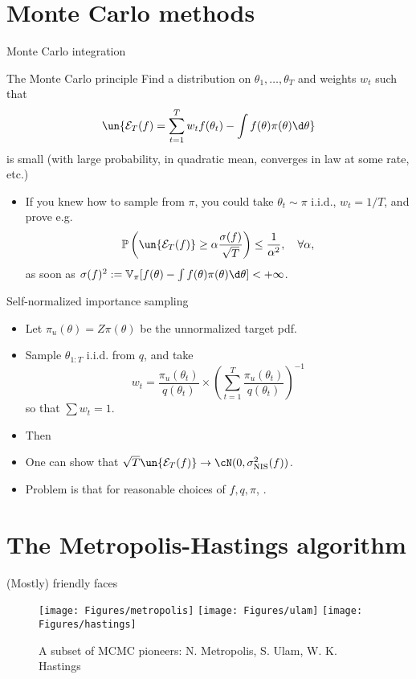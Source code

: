 \documentclass[10pt]{beamer}
\begin{document}
\section{Monte Carlo methods}
\begin{frame}{Monte Carlo integration}
\begin{block}{The Monte Carlo principle}
Find a distribution on $\theta_1,\dots,\theta_T$ and weights $w_t$ such that
$$ \un{\mathcal{E}_T(f) =  \sum_{t=1}^T w_t f(\theta_t) - \int f(\theta)\pi(\theta)\d \theta}$$
is small (with large probability, in quadratic mean, converges in law at some rate, etc.)
\end{block}
\begin{itemize}
  \item If you knew how to sample from $\pi$, you could take $\theta_t\sim\pi$ i.i.d., $w_t=1/T$, and prove e.g.
  $$ \mathbb{P}\left( \un{\mathcal{E}_T(f)} \geq \alpha\frac{\sigma(f)}{\sqrt{T}} \right) \leq \frac{1}{\alpha^2}, \quad \forall \alpha,$$
  as soon as $\sigma(f)^2 := \mathbb{V}_\pi [f(\theta) - \int f(\theta)\pi(\theta)\d\theta]<+\infty$.
\end{itemize}
\end{frame}

\begin{frame}{Self-normalized importance sampling}
\begin{itemize}
  \item Let $\pi_u(\theta) = Z\pi(\theta)$ be the unnormalized target pdf.
  \item Sample $\theta_{1:T}$ i.i.d. from $q$, and take
  $$
  w_t = \frac{\pi_u(\theta_t)}{q(\theta_t)} \times \left( \sum_{t=1}^T \frac{\pi_u(\theta_t)}{q(\theta_t)} \right)^{-1}
  $$
  so that $\sum w_t = 1$.
  \item Then
  $$$$
  \vfill
  \item One can show that $ \sqrt{T}\un{\mathcal{E}_T(f)} \rightarrow \cN(0, \sigma^2_{\text{NIS}}(f))$.
  \item Problem is that for reasonable choices of $f,q,\pi$, .
\end{itemize}
\end{frame}

\section{The Metropolis-Hastings algorithm}

\begin{frame}{(Mostly) friendly faces}
\begin{figure}
  \hfill
  \texttt{[image: Figures/metropolis]}
  \hfill
  \texttt{[image: Figures/ulam]}
  \hfill
  \texttt{[image: Figures/hastings]}
  \hfill
  \caption{A subset of MCMC pioneers: N. Metropolis, S. Ulam, W. K. Hastings}
\end{figure}\end{frame}
\end{document}
